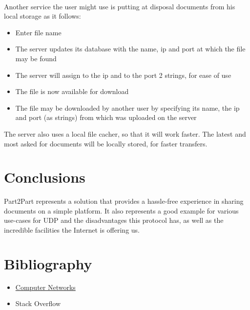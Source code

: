 \documentclass[paper=a4, fontsize=11pt]{scrartcl}
\begin{document}
\paragraph{}
Another service the user might use is putting at disposal documents from his local storage as it follows:
\begin{itemize}  
\item Enter file name
\item The server updates its database with the name, ip and port at which the file may be found
\item The server will assign to the ip and to the port 2 strings, for ease of use
\item The file is now available for download
\item The file may be downloaded by another user by specifying its name, the ip and port (as strings) from which was uploaded on the server
\end{itemize}

The server also uses a local file cacher, so that it will work faster. The latest and most asked for documents will be locally stored, for faster transfers.

\section{Conclusions}
\paragraph{}
Part2Part represents a solution that provides a hassle-free experience in sharing documents on a simple platform. It also represents a good example for various use-cases for UDP and the disadvantages this protocol has, as well as the incredible facilities the Internet is offering us.

\section{Bibliography}

\begin{itemize}  
\item \href{https://profs.info.uaic.ro/~computernetworks/index.php}{Computer Networks}
\item Stack	 Overflow
\end{itemize}
\end{document}
